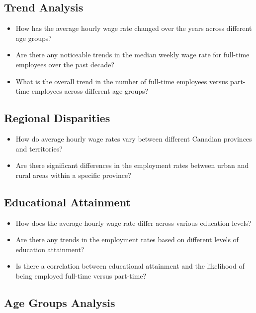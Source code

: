 \documentclass[
]{article}
\providecommand{\tightlist}{%
  \setlength{\itemsep}{0pt}\setlength{\parskip}{0pt}}
\begin{document}
\subsection{Trend Analysis}\label{trend-analysis}

\begin{itemize}
\tightlist
\item
  How has the average hourly wage rate changed over the years across
  different age groups?
\item
  Are there any noticeable trends in the median weekly wage rate for
  full-time employees over the past decade?
\item
  What is the overall trend in the number of full-time employees versus
  part-time employees across different age groups?
\end{itemize}

\subsection{Regional Disparities}\label{regional-disparities}

\begin{itemize}
\tightlist
\item
  How do average hourly wage rates vary between different Canadian
  provinces and territories?
\item
  Are there significant differences in the employment rates between
  urban and rural areas within a specific province?
\end{itemize}

\subsection{Educational Attainment}\label{educational-attainment}

\begin{itemize}
\tightlist
\item
  How does the average hourly wage rate differ across various education
  levels?
\item
  Are there any trends in the employment rates based on different levels
  of education attainment?
\item
  Is there a correlation between educational attainment and the
  likelihood of being employed full-time versus part-time?
\end{itemize}

\subsection{Age Groups Analysis}\label{age-groups-analysis}
\end{document}
